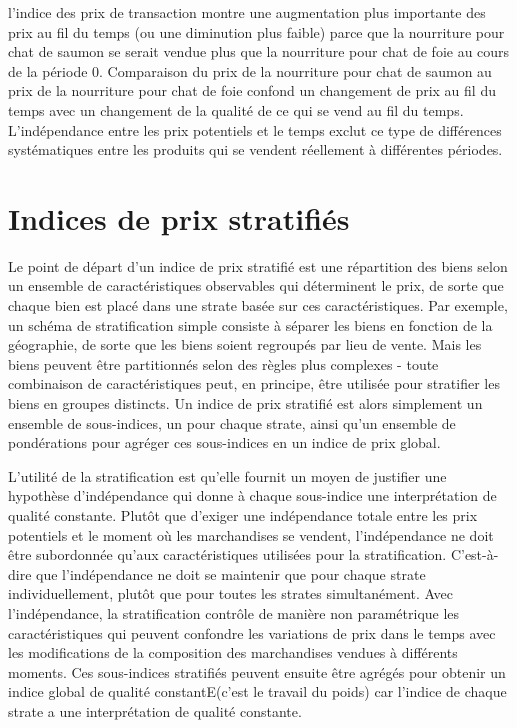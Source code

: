 \documentclass[]{article}
\begin{document}
l'indice des prix de transaction montre une augmentation plus importante des prix au fil du temps (ou une diminution plus faible) parce que la nourriture pour chat de saumon se serait vendue plus que la nourriture pour chat de foie au cours de la période 0. Comparaison du prix de la nourriture pour chat de saumon au prix de la nourriture pour chat de foie confond un changement de prix au fil du temps avec un changement de la qualité de ce qui se vend au fil du temps. L'indépendance entre les prix potentiels et le temps exclut ce type de différences systématiques entre les produits qui se vendent réellement à différentes périodes.

\hypertarget{indices-de-prix-stratifiuxe9s}{%
\section{Indices de prix stratifiés}\label{indices-de-prix-stratifiuxe9s}}

Le point de départ d'un indice de prix stratifié est une répartition des biens selon un ensemble de caractéristiques observables qui déterminent le prix, de sorte que chaque bien est placé dans une strate basée sur ces caractéristiques. Par exemple, un schéma de stratification simple consiste à séparer les biens en fonction de la géographie, de sorte que les biens soient regroupés par lieu de vente. Mais les biens peuvent être partitionnés selon des règles plus complexes - toute combinaison de caractéristiques peut, en principe, être utilisée pour stratifier les biens en groupes distincts. Un indice de prix stratifié est alors simplement un ensemble de sous-indices, un pour chaque strate, ainsi qu'un ensemble de pondérations pour agréger ces sous-indices en un indice de prix global.

L'utilité de la stratification est qu'elle fournit un moyen de justifier une hypothèse d'indépendance qui donne à chaque sous-indice une interprétation de qualité constante. Plutôt que d'exiger une indépendance totale entre les prix potentiels et le moment où les marchandises se vendent, l'indépendance ne doit être subordonnée qu'aux caractéristiques utilisées pour la stratification. C'est-à-dire que l'indépendance ne doit se maintenir que pour chaque strate individuellement, plutôt que pour toutes les strates simultanément. Avec l'indépendance, la stratification contrôle de manière non paramétrique les caractéristiques qui peuvent confondre les variations de prix dans le temps avec les modifications de la composition des marchandises vendues à différents moments. Ces sous-indices stratifiés peuvent ensuite être agrégés pour obtenir un indice global de qualité constantE(c'est le travail du poids) car l'indice de chaque strate a une interprétation de qualité constante.
\end{document}
